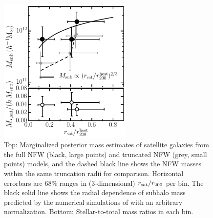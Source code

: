 \begin{figure}
\begin{minipage}[b]{2.6in}
 \centerline{\includegraphics[width=2.6in]{chapter5/massradius_norm.pdf}}
\end{minipage}
\begin{minipage}[b]{2.2in}
\caption{Top: Marginalized posterior mass estimates of satellite galaxies from the full NFW 
(black, large points) and truncated NFW (grey, small points) models, and the dashed black line shows 
the NFW masses within the same truncation radii for comparison. Horizontal errorbars are 68\% ranges 
in (3-dimensional) $r_{\rm sat}/r_{200}$ per bin. The black solid line shows the radial dependence 
of subhalo mass predicted by the numerical simulations of \citet{gao04} with an arbitrary 
normalization.
Bottom: Stellar-to-total mass ratios in each bin.}
\label{f:msat_r}
\end{minipage}
\end{figure}

